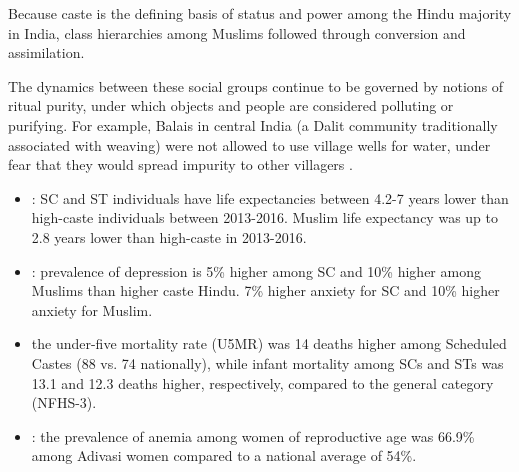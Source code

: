 Because caste is the defining basis of status and power among the Hindu majority in India, class hierarchies among Muslims followed through conversion and assimilation. 


The dynamics between these social groups continue to be governed by notions of ritual purity, under which objects and people are considered polluting or purifying. For example, Balais in central India (a Dalit community traditionally associated with weaving) were not allowed to use village wells for water, under fear that they would spread impurity to other villagers \citep{ambedkar2014annihilation}.

\begin{itemize}

    \item \cite{gupta2022large}: SC and ST individuals have life expectancies between 4.2-7 years lower than high-caste individuals between 2013-2016. Muslim life expectancy was up to 2.8 years lower than high-caste in 2013-2016.

    \item \cite{gupta2020caste}: prevalence of depression is 5\% higher among SC and 10\% higher among Muslims than higher caste Hindu. 7\% higher anxiety for SC and 10\% higher anxiety for Muslim. 

    \item \cite{ramaiah2015health} the under-five mortality rate (U5MR) was 14 deaths higher among Scheduled Castes (88 vs. 74 nationally), while infant mortality among SCs and STs was 13.1 and 12.3 deaths higher, respectively, compared to the general category (NFHS-3). 
    
    \item \cite{let2024prevalence}: the prevalence of anemia among women of reproductive age was 66.9\% among Adivasi women compared to a national average of 54\%.

\end{itemize}



